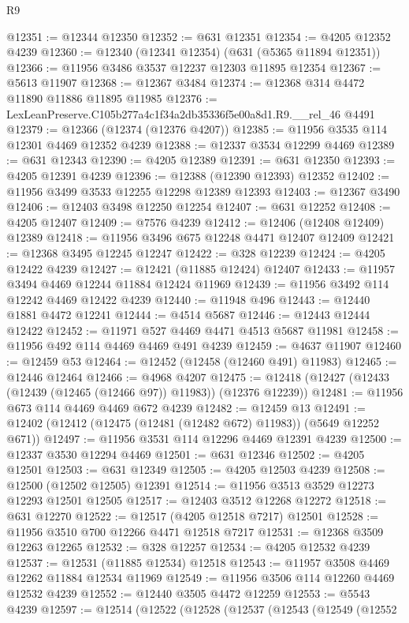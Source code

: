 \begin{lexlean}{R9}
\begin{coremodule}
@12351 := @12344 @12350
@12352 := @631 @12351
@12354 := @4205 @12352 @4239
@12360 := @12340 (@12341 @12354) (@631 (@5365 @11894 @12351))
@12366 := @11956 @3486 @3537 @12237 @12303 @11895 @12354
@12367 := @5613 @11907
@12368 := @12367 @3484
@12374 := @12368 @314 @4472 @11890 @11886 @11895 @11985
@12376 := LexLeanPreserve.C105b277a4c1f34a2db35336f5e00a8d1.R9.__rel_46 @4491
@12379 := @12366 (@12374 (@12376 @4207))
@12385 := @11956 @3535 @114 @12301 @4469 @12352 @4239
@12388 := @12337 @3534 @12299 @4469
@12389 := @631 @12343
@12390 := @4205 @12389
@12391 := @631 @12350
@12393 := @4205 @12391 @4239
@12396 := @12388 (@12390 @12393) @12352
@12402 := @11956 @3499 @3533 @12255 @12298 @12389 @12393
@12403 := @12367 @3490
@12406 := @12403 @3498 @12250 @12254
@12407 := @631 @12252
@12408 := @4205 @12407
@12409 := @7576 @4239
@12412 := @12406 (@12408 @12409) @12389
@12418 := @11956 @3496 @675 @12248 @4471 @12407 @12409
@12421 := @12368 @3495 @12245 @12247
@12422 := @328 @12239
@12424 := @4205 @12422 @4239
@12427 := @12421 (@11885 @12424) @12407
@12433 := @11957 @3494 @4469 @12244 @11884 @12424 @11969
@12439 := @11956 @3492 @114 @12242 @4469 @12422 @4239
@12440 := @11948 @496
@12443 := @12440 @1881 @4472 @12241
@12444 := @4514 @5687
@12446 := @12443 @12444 @12422
@12452 := @11971 @527 @4469 @4471 @4513 @5687 @11981
@12458 := @11956 @492 @114 @4469 @4469 @491 @4239
@12459 := @4637 @11907
@12460 := @12459 @53
@12464 := @12452 (@12458 (@12460 @491) @11983)
@12465 := @12446 @12464
@12466 := @4968 @4207
@12475 := @12418 (@12427 (@12433 (@12439 (@12465 (@12466 @97)) @11983)) (@12376 @12239))
@12481 := @11956 @673 @114 @4469 @4469 @672 @4239
@12482 := @12459 @13
@12491 := @12402 (@12412 (@12475 (@12481 (@12482 @672) @11983)) (@5649 @12252 @671))
@12497 := @11956 @3531 @114 @12296 @4469 @12391 @4239
@12500 := @12337 @3530 @12294 @4469
@12501 := @631 @12346
@12502 := @4205 @12501
@12503 := @631 @12349
@12505 := @4205 @12503 @4239
@12508 := @12500 (@12502 @12505) @12391
@12514 := @11956 @3513 @3529 @12273 @12293 @12501 @12505
@12517 := @12403 @3512 @12268 @12272
@12518 := @631 @12270
@12522 := @12517 (@4205 @12518 @7217) @12501
@12528 := @11956 @3510 @700 @12266 @4471 @12518 @7217
@12531 := @12368 @3509 @12263 @12265
@12532 := @328 @12257
@12534 := @4205 @12532 @4239
@12537 := @12531 (@11885 @12534) @12518
@12543 := @11957 @3508 @4469 @12262 @11884 @12534 @11969
@12549 := @11956 @3506 @114 @12260 @4469 @12532 @4239
@12552 := @12440 @3505 @4472 @12259
@12553 := @5543 @4239
@12597 := @12514
    (@12522
      (@12528
        (@12537
          (@12543
            (@12549
              (@12552

\end{coremodule}
\end{lexlean}
